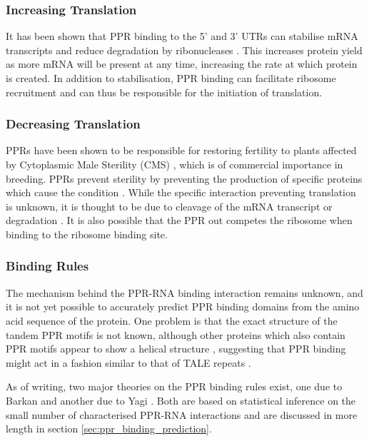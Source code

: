 \subsubsection{Increasing Translation}

It has been shown that PPR binding to the 5' and 3' UTRs can stabilise mRNA
transcripts and reduce degradation by
ribonucleases \citep{Pfalz2009,Prikryl2011}.
This increases protein yield as more mRNA will be present at any time,
increasing the rate at which protein is created.
In addition to stabilisation, PPR binding can facilitate ribosome recruitment
and can thus be responsible for the initiation of translation.

\subsubsection{Decreasing Translation}

PPRs have been shown to be responsible for restoring fertility to plants
affected by Cytoplasmic Male Sterility (CMS) \citep{Bentolila2002}, which is of
commercial importance in breeding.
PPRs prevent sterility by preventing the production of specific proteins which
cause the condition \citep{Kazama2008}.
While the specific interaction preventing translation is unknown, it is thought
to be due to cleavage of the mRNA transcript or degradation \citep{Wang2006}.
It is also possible that the PPR out competes the ribosome when binding to the
ribosome binding site.

\subsubsection{Binding Rules}

The mechanism behind the PPR-RNA binding interaction remains unknown, 
and it is not yet
possible to accurately predict PPR binding domains from the amino acid sequence
of the protein.
One problem is that the exact structure of the tandem PPR motifs is not known,
although other proteins which also contain PPR motifs appear to show a helical
structure \citep{Ringel2011,Howard2012}, suggesting that PPR binding might act
in a fashion similar to that of TALE repeats \citep{Rubinson2012}.

As of writing, two major theories on the PPR binding rules exist, one due to
Barkan \citep{Barkan2012} and another due to Yagi \citep{Yagi2013}.
Both are based on statistical inference on the small number of characterised
PPR-RNA interactions and are discussed in more length in section
\ref{sec:ppr_binding_prediction}.

